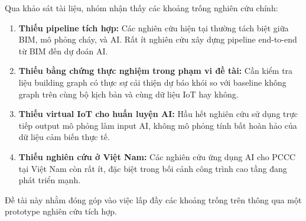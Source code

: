 Qua khảo sát tài liệu, nhóm nhận thấy các khoảng trống nghiên cứu chính:

\begin{enumerate}
  \item \textbf{Thiếu pipeline tích hợp:} Các nghiên cứu hiện tại thường tách biệt giữa BIM, mô phỏng cháy, và AI. Rất ít nghiên cứu xây dựng pipeline end-to-end từ BIM đến dự đoán AI.
  \item \textbf{Thiếu bằng chứng thực nghiệm trong phạm vi đề tài:} Cần kiểm tra liệu building graph có thực sự cải thiện dự báo khói so với baseline không graph trên cùng bộ kịch bản và cùng dữ liệu IoT hay không.
  \item \textbf{Thiếu virtual IoT cho huấn luyện AI:} Hầu hết nghiên cứu sử dụng trực tiếp output mô phỏng làm input AI, không mô phỏng tính bất hoàn hảo của dữ liệu cảm biến thực tế.
  \item \textbf{Thiếu nghiên cứu ở Việt Nam:} Các nghiên cứu ứng dụng AI cho PCCC tại Việt Nam còn rất ít, đặc biệt trong bối cảnh công trình cao tầng đang phát triển mạnh.
\end{enumerate}

Đề tài này nhằm đóng góp vào việc lấp đầy các khoảng trống trên thông qua một prototype nghiên cứu tích hợp.
